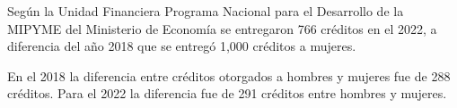Según la Unidad Financiera Programa Nacional para el Desarrollo de la MIPYME del Ministerio de Economía se entregaron 766 créditos en el 2022, a diferencia del año 2018 que se entregó 1,000 créditos a mujeres.

En el 2018 la diferencia entre créditos otorgados a hombres y mujeres fue de 288 créditos. Para el 2022 la diferencia fue de 291 créditos entre hombres y mujeres. 
